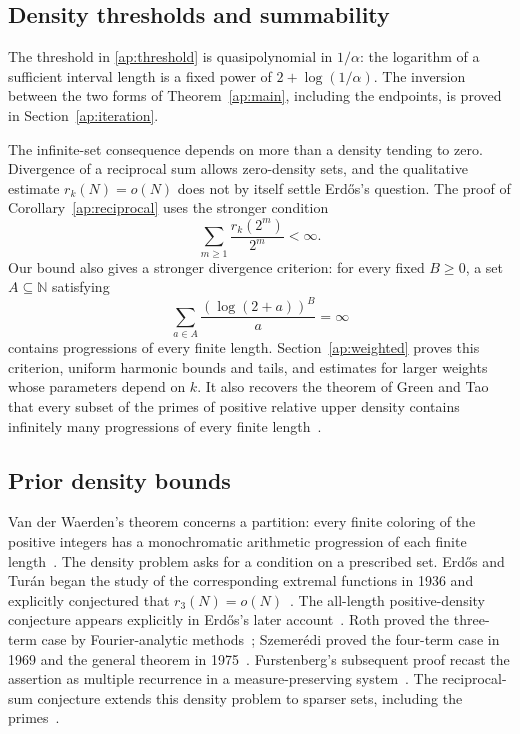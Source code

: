 \subsection{Density thresholds and summability}

The threshold in \eqref{ap:threshold} is quasipolynomial in
$1/\alpha$: the logarithm of a sufficient interval length is a fixed
power of $2+\log(1/\alpha)$. The inversion between the two forms of
Theorem~\ref{ap:main}, including the endpoints, is proved in
Section~\ref{ap:iteration}.

The infinite-set consequence depends on more than a density tending
to zero. Divergence of a reciprocal sum allows zero-density sets,
and the qualitative estimate $r_k(N)=o(N)$ does not by itself settle
Erd\H{o}s's question. The proof of Corollary~\ref{ap:reciprocal}
uses the stronger condition
\[
                   \sum_{m\ge1}\frac{r_k(2^m)}{2^m}<\infty.
\]
Our bound also gives a stronger divergence criterion: for every
fixed $B\ge0$, a set $A\subseteq\mathbb N$ satisfying
\[
             \sum_{a\in A}\frac{(\log(2+a))^B}{a}=\infty
\]
contains progressions of every finite length. Section~\ref{ap:weighted}
proves this criterion, uniform harmonic bounds and tails, and
estimates for larger weights whose parameters depend on $k$.
It also recovers the theorem of Green and Tao that every subset
of the primes of positive relative upper density contains infinitely
many progressions of every finite length~\cite[Theorem~1.2]{GreenTaoPrimes2008}.

\subsection{Prior density bounds}

Van der Waerden's theorem concerns a partition: every finite coloring
of the positive integers has a monochromatic arithmetic progression
of each finite length~\cite{vanDerWaerden1927}. The density problem
asks for a condition on a prescribed set. Erd\H{o}s and Tur\'an
began the study of the corresponding extremal functions in 1936
and explicitly conjectured that $r_3(N)=o(N)$~\cite{ErdosTuran1936}.
The all-length positive-density conjecture appears explicitly in
Erd\H{o}s's later account~\cite[Section~I.19]{Erdos1961}.
Roth proved the three-term case by Fourier-analytic
methods~\cite{Roth1953}; Szemer\'edi proved the four-term case in
1969 and the general theorem in 1975~\cite{Szemeredi1969,Szemeredi1975}.
Furstenberg's subsequent proof recast the assertion as multiple
recurrence in a measure-preserving system~\cite{Furstenberg1977}.
The reciprocal-sum conjecture extends this density problem to
sparser sets, including the primes~\cite[Problem~4.33.6]{Erdos1974}.

